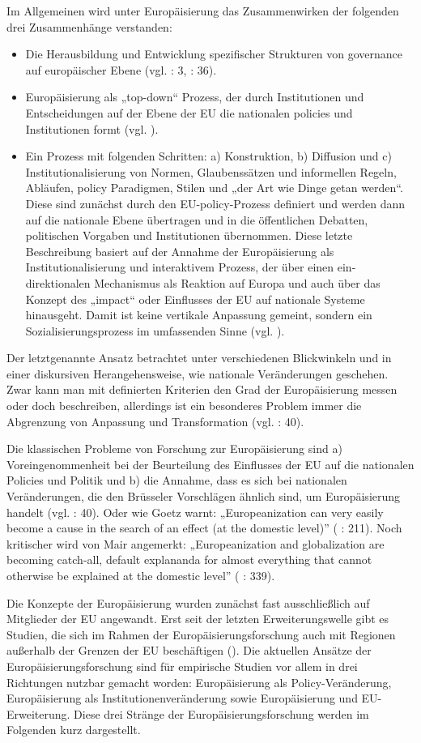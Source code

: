Im Allgemeinen wird unter Europäisierung das Zusammenwirken der folgenden drei Zusammenhänge verstanden: 
\begin{itemize} \itemsep1pt \parskip0pt 
\item Die Herausbildung und Entwicklung spezifischer Strukturen von governance auf europäischer Ebene (vgl. \cite{risseetal} : 3, \cite{radpas} : 36).
\item Europäisierung als „top-down“ Prozess, der durch Institutionen und Entscheidungen auf der Ebene der EU die nationalen policies und Institutionen formt (vgl. \cite{herit}).
\item Ein Prozess mit folgenden Schritten: a) Konstruktion, b) Diffusion und c) Institutionalisierung von Normen, Glaubenssätzen und informellen Regeln, Abläufen, policy Paradigmen, Stilen und „der Art wie Dinge getan werden“. Diese sind zunächst durch den EU-policy-Prozess definiert und werden dann auf die nationale Ebene übertragen und in die öffentlichen Debatten, politischen Vorgaben und Institutionen übernommen. Diese letzte Beschreibung basiert auf der Annahme der Europäisierung als Institutionalisierung und interaktivem Prozess, der über einen ein-direktionalen Mechanismus als Reaktion auf Europa und auch über das Konzept des „impact“ oder Einflusses der EU auf nationale Systeme hinausgeht. Damit ist keine vertikale Anpassung gemeint, sondern ein Sozialisierungsprozess im umfassenden Sinne (vgl. \cite{fearad03, olsen}).
\end{itemize}
Der letztgenannte Ansatz betrachtet unter verschiedenen Blickwinkeln und in einer diskursiven Herangehensweise, wie nationale Veränderungen geschehen. Zwar kann man mit definierten Kriterien den Grad der Europäisierung messen oder doch beschreiben, allerdings ist ein besonderes Problem immer die Abgrenzung von Anpassung und Transformation (vgl. \cite{radpas} : 40).\par
Die klassischen Probleme von Forschung zur Europäisierung sind a) Voreingenommenheit bei der Beurteilung des Einflusses der EU auf die nationalen Policies und Politik und b) die Annahme, dass es sich bei nationalen Veränderungen, die den Brüsseler Vorschlägen ähnlich sind, um Europäisierung handelt (vgl. \cite{radpas} : 40). Oder wie Goetz warnt: „Europeanization can very easily become a cause in the search of an effect (at the domestic level)” (\cite{goetz01a} : 211). Noch kritischer wird von Mair angemerkt: „Europeanization and globalization are becoming catch-all, default explananda for almost everything that cannot otherwise be explained at the domestic level” (\cite{mair} : 339).\par
Die Konzepte der Europäisierung wurden zunächst fast ausschließlich auf Mitglieder der EU angewandt. Erst seit der letzten Erweiterungswelle gibt es Studien, die sich im Rahmen der Europäisierungsforschung auch mit Regionen außerhalb der Grenzen der EU beschäftigen (\cite{lipumwes, grab03, papadi, lavenex, schsed05b, schsed05c}). Die aktuellen Ansätze der Europäisierungsforschung sind für empirische Studien vor allem in drei Richtungen nutzbar gemacht worden: Europäisierung als Policy-Veränderung, Europäisierung als Institutionenveränderung sowie Europäisierung und EU-Erweiterung. Diese drei Stränge der Europäisierungsforschung werden im Folgenden kurz dargestellt.
